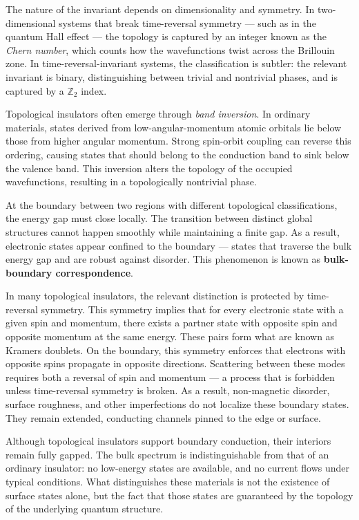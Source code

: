 The nature of the invariant depends on dimensionality and symmetry. In two-dimensional systems that break time-reversal symmetry — such as in the quantum Hall effect — the topology is captured by an integer known as the \emph{Chern number}, which counts how the wavefunctions twist across the Brillouin zone. In time-reversal-invariant systems, the classification is subtler: the relevant invariant is binary, distinguishing between trivial and nontrivial phases, and is captured by a \(\mathbb{Z}_2\) index.

Topological insulators often emerge through \emph{band inversion}. In ordinary materials, states derived from low-angular-momentum atomic orbitals lie below those from higher angular momentum. Strong spin-orbit coupling can reverse this ordering, causing states that should belong to the conduction band to sink below the valence band. This inversion alters the topology of the occupied wavefunctions, resulting in a topologically nontrivial phase.

At the boundary between two regions with different topological classifications, the energy gap must close locally. The transition between distinct global structures cannot happen smoothly while maintaining a finite gap. As a result, electronic states appear confined to the boundary — states that traverse the bulk energy gap and are robust against disorder. This phenomenon is known as \textbf{bulk-boundary correspondence}.

In many topological insulators, the relevant distinction is protected by time-reversal symmetry. This symmetry implies that for every electronic state with a given spin and momentum, there exists a partner state with opposite spin and opposite momentum at the same energy. These pairs form what are known as Kramers doublets. On the boundary, this symmetry enforces that electrons with opposite spins propagate in opposite directions. Scattering between these modes requires both a reversal of spin and momentum — a process that is forbidden unless time-reversal symmetry is broken. As a result, non-magnetic disorder, surface roughness, and other imperfections do not localize these boundary states. They remain extended, conducting channels pinned to the edge or surface.

Although topological insulators support boundary conduction, their interiors remain fully gapped. The bulk spectrum is indistinguishable from that of an ordinary insulator: no low-energy states are available, and no current flows under typical conditions. What distinguishes these materials is not the existence of surface states alone, but the fact that those states are guaranteed by the topology of the underlying quantum structure.

